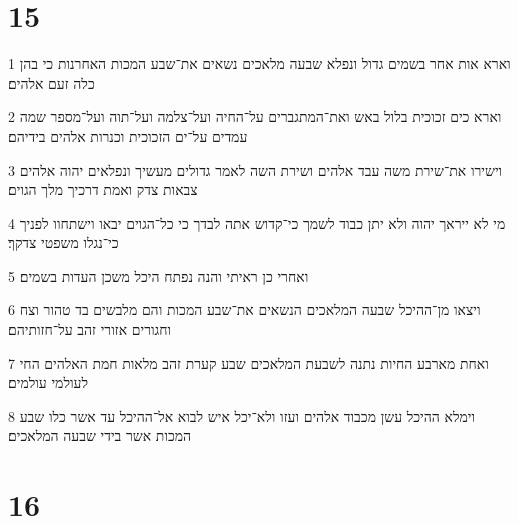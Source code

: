 \chapter{15}

\par 1 וארא אות אחר בשמים גדול ונפלא שבעה מלאכים נשאים את־שבע המכות האחרנות כי בהן כלה זעם אלהים׃
\par 2 וארא כים זכוכית בלול באש ואת־המתגברים על־החיה ועל־צלמה ועל־תוה ועל־מספר שמה עמדים על־ים הזכוכית וכנרות אלהים בידיהם׃
\par 3 וישירו את־שירת משה עבד אלהים ושירת השה לאמר גדולים מעשיך ונפלאים יהוה אלהים צבאות צדק ואמת דרכיך מלך הגוים׃
\par 4 מי לא ייראך יהוה ולא יתן כבוד לשמך כי־קדוש אתה לבדך כי כל־הגוים יבאו וישתחוו לפניך כי־נגלו משפטי צדקך׃
\par 5 ואחרי כן ראיתי והנה נפתח היכל משכן העדות בשמים׃
\par 6 ויצאו מן־ההיכל שבעה המלאכים הנשאים את־שבע המכות והם מלבשים בד טהור וצח וחגורים אזורי זהב על־חזותיהם׃
\par 7 ואחת מארבע החיות נתנה לשבעת המלאכים שבע קערת זהב מלאות חמת האלהים החי לעולמי עולמים׃
\par 8 וימלא ההיכל עשן מכבוד אלהים ועזו ולא־יכל איש לבוא אל־ההיכל עד אשר כלו שבע המכות אשר בידי שבעה המלאכים׃

\chapter{16}

